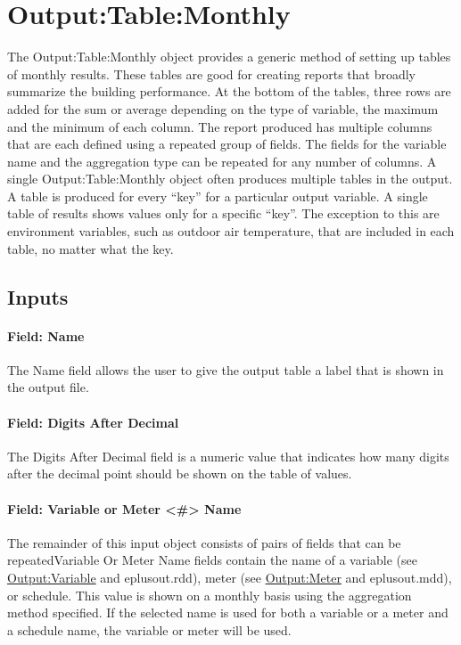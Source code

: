 \section{Output:Table:Monthly}\label{outputtablemonthly}

The Output:Table:Monthly object provides a generic method of setting up tables of monthly results. These tables are good for creating reports that broadly summarize the building performance. At the bottom of the tables, three rows are added for the sum or average depending on the type of variable, the maximum and the minimum of each column. The report produced has multiple columns that are each defined using a repeated group of fields. The fields for the variable name and the aggregation type can be repeated for any number of columns. A single Output:Table:Monthly object often produces multiple tables in the output. A table is produced for every ``key'' for a particular output variable. A single table of results shows values only for a specific ``key''. The exception to this are environment variables, such as outdoor air temperature, that are included in each table, no matter what the key.

\subsection{Inputs}\label{inputs-063}

\paragraph{Field: Name}\label{field-name-061}

The Name field allows the user to give the output table a label that is shown in the output file.

\paragraph{Field: Digits After Decimal}\label{field-digits-after-decimal}

The Digits After Decimal field is a numeric value that indicates how many digits after the decimal point should be shown on the table of values.

\paragraph{Field: Variable or Meter \textless{}\#\textgreater{} Name}\label{field-variable-or-meter-name-000}

The remainder of this input object consists of pairs of fields that can be repeatedVariable Or Meter Name fields contain the name of a variable (see \hyperref[outputvariable]{Output:Variable} and eplusout.rdd), meter (see \hyperref[outputmeter-and-outputmetermeterfileonly]{Output:Meter} and eplusout.mdd), or schedule. This value is shown on a monthly basis using the aggregation method specified. If the selected name is used for both a variable or a meter and a schedule name, the variable or meter will be used.

